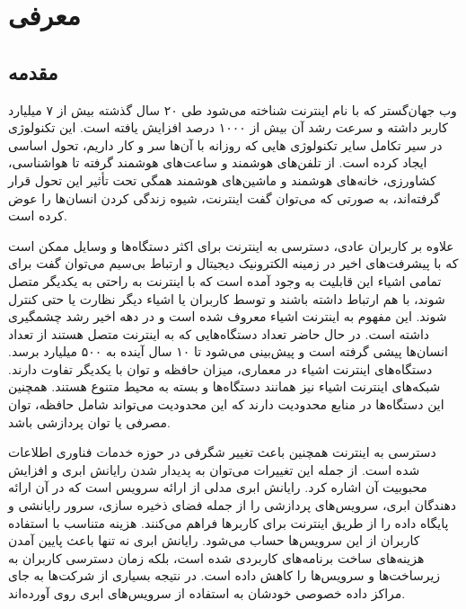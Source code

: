 \chapter{معرفی}

\section{مقدمه‌}

وب جهان‌گستر که با نام اینترنت شناخته می‌شود طی ۲۰ سال گذشته بیش از ۷ میلیارد کاربر داشته و سرعت رشد آن بیش از ۱۰۰۰ درصد افزایش یافته است. این تکنولوژی در سیر تکامل سایر تکنولوژی هایی که روزانه با آن‌ها سر و کار داریم، تحول اساسی ایجاد کرده است. از تلفن‌های هوشمند و ساعت‌های هوشمند گرفته تا هواشناسی، کشاورزی، خانه‌های هوشمند و ماشین‌های هوشمند همگی تحت تأثیر این تحول قرار گرفته‌اند، به صورتی که می‌توان گفت اینترنت، شیوه زندگی کردن انسان‌ها را عوض کرده ‌است.

علاوه‌ بر کاربران عادی، دسترسی به اینترنت برای اکثر دستگاه‌ها و وسایل ممکن است که با پیشرفت‌های اخیر در زمینه الکترونیک دیجیتال و ارتباط بی‌سیم می‌توان گفت برای تمامی اشیاء این قابلیت به وجود آمده است که با اینترنت به راحتی به یکدیگر متصل شوند، با هم ارتباط داشته باشند و توسط کاربران یا اشیاء دیگر نظارت یا حتی کنترل شوند. این مفهوم به اینترنت اشیاء معروف شده است و در دهه اخیر رشد چشمگیری داشته است. در حال حاضر تعداد دستگاه‌هایی که به اینترنت متصل هستند از تعداد انسان‌ها پیشی گرفته است و پیش‌بینی می‌شود تا ۱۰ سال آینده به ۵۰۰ میلیارد برسد. دستگاه‌های اینترنت اشیاء در معماری، میزان حافظه و توان با یکدیگر تفاوت دارند. شبکه‌های اینترنت اشیاء نیز همانند دستگاه‌ها و بسته به محیط متنوع هستند. همچنین این دستگاه‌ها در منابع محدودیت دارند که این محدودیت می‌تواند شامل حافظه، توان مصرفی یا توان پردازشی باشد.

دسترسی به اینترنت همچنین باعث تغییر شگرفی در حوزه خدمات فناوری اطلاعات شده است. از جمله این تغییرات می‌توان به پدیدار شدن رایانش ابری و افزایش محبوبیت آن اشاره کرد. رایانش ابری مدلی از ارائه سرویس است که در آن ارائه دهندگان ابری، سرویس‌های پردازشی را از جمله فضای ذخیره سازی، سرور‌ رایانشی و پایگاه داده‌ را از طریق اینترنت برای کاربر‌ها فراهم می‌کنند. هزینه متناسب با استفاده کاربران از این سرویس‌ها حساب می‌شود. رایانش ابری نه تنها باعث پایین آمدن هزینه‌های ساخت برنامه‌های کاربردی شده است، بلکه زمان دسترسی کاربران به زیرساخت‌ها و سرویس‌ها را کاهش داده است. در نتیجه بسیاری از شرکت‌ها به جای مراکز داده خصوصی خودشان به استفاده از سرویس‌های ابری روی آورده‌اند.

\hfill


